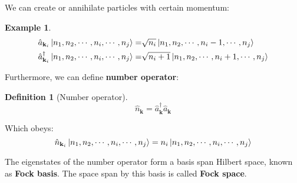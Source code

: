 \documentclass[12pt]{article}
\numberwithin{equation}{section}
\theoremstyle{1style}
\newtheorem{definition}[equation]{Definition}
\newtheorem{example}[equation]{Example}
\newcommand{\tbf}[1]{\textbf{#1}}
\begin{document}
We can create or annihilate particles with certain momentum:
\begin{example}
  \begin{align*}
    \hat{a}_{\mathbf{k}_i}\ket{n_1,n_2,\cdots,n_i,\cdots,n_j}=           & \sqrt{n_i}\ket{n_1,n_2,\cdots,n_i-1,\cdots,n_j}   \\
    \hat{a}^{\dagger}_{\mathbf{k}_i}\ket{n_1,n_2,\cdots,n_i,\cdots,n_j}= & \sqrt{n_i+1}\ket{n_1,n_2,\cdots,n_i+1,\cdots,n_j}
  \end{align*}
\end{example}

Furthermore, we can define \tbf{number operator}:
\begin{definition}[Number operator]
  \[\hat{n}_{\mathbf{k}}=\hat{a}^\dagger_{\mathbf{k}}\hat{a}_{\mathbf{k}}\]
\end{definition}

Which obeys:
\begin{equation}
  \hat{n}_{\mathbf{k}_i}\ket{n_1,n_2,\cdots,n_i,\cdots,n_j}=    n_i\ket{n_1,n_2,\cdots,n_i,\cdots,n_j}
\end{equation}

The eigenstates of the number operator form a basis span Hilbert space, known as \tbf{Fock basis}.
The space span by this basis is called \tbf{Fock space}.
\end{document}
